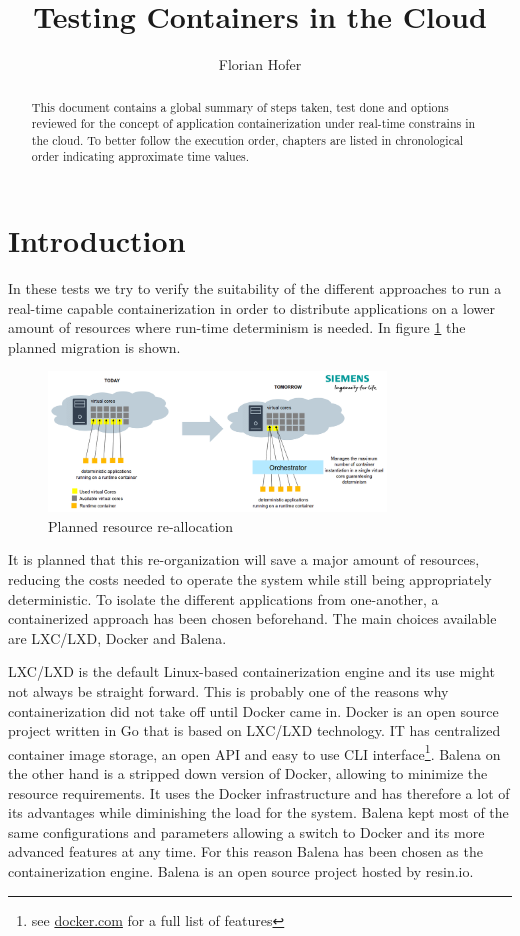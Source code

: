 \documentclass[]{scrartcl}
\title{Testing Containers in the Cloud}
\author{Florian Hofer}
\date{}
\begin{document}
\maketitle

\begin{abstract}
	This document contains a global summary of steps taken, test done and options reviewed for the concept of application containerization under real-time constrains in the cloud. To better follow the execution order, chapters are listed in chronological order indicating approximate time values.
\end{abstract}

\section{Introduction}

In these tests we try to verify the suitability of the different approaches to run a real-time capable containerization in order to distribute applications on a lower amount of resources where run-time determinism is needed. In figure \ref{fig:plan} the planned migration is shown. 

\begin{figure}
	\centering
	\includegraphics[width=0.8\textwidth]{plan}
	\caption{Planned resource re-allocation}
	\label{fig:plan}
\end{figure}

It is planned that this re-organization will save a major amount of resources, reducing the costs needed to operate the system while still being appropriately deterministic. To isolate the different applications from one-another, a containerized approach has been chosen beforehand. The main choices available are LXC/LXD, Docker and Balena.

LXC/LXD is the default Linux-based containerization engine and its use might not always be straight forward. This is probably one of the reasons why containerization did not take off until Docker came in. Docker is an open source project written in Go that is based on LXC/LXD technology. IT has centralized container image storage, an open API and easy to use CLI interface\footnote{see \url{docker.com} for a full list of features}. Balena on the other hand is a stripped down version of Docker, allowing to minimize the resource requirements. It uses the Docker infrastructure and has therefore a lot of its advantages while diminishing the load for the system. Balena kept most of the same configurations and parameters allowing a switch to Docker and its more advanced features at any time. For this reason Balena has been chosen as the containerization engine. Balena is an open source project hosted by resin.io.
\end{document}
